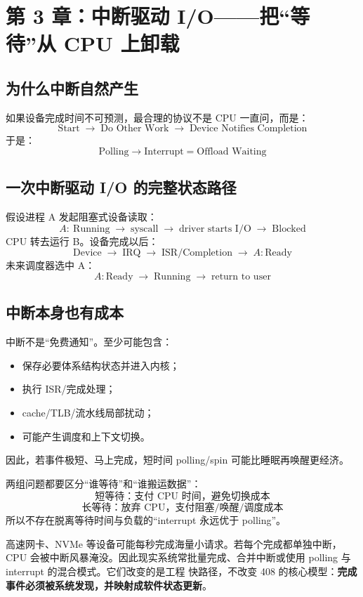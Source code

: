 \documentclass[UTF8,fontset=fandol,11pt,a4paper]{ctexart}
\newcommand{\kw}[1]{\textbf{#1}}
\newcommand{\arr}{\;\longrightarrow\;}
\begin{document}
\section{第 3 章：中断驱动 I/O——把“等待”从 CPU 上卸载}

\subsection{为什么中断自然产生}
如果设备完成时间不可预测，最合理的协议不是 CPU 一直问，而是：
\[
\boxed{\text{Start}\arr\text{Do Other Work}\arr\text{Device Notifies Completion}}
\]
于是：
\[
\boxed{\text{Polling}\to\text{Interrupt}=\text{Offload Waiting}}
\]

\subsection{一次中断驱动 I/O 的完整状态路径}
假设进程 A 发起阻塞式设备读取：
\[
A:\ \text{Running}
\arr \text{syscall}
\arr \text{driver starts I/O}
\arr \text{Blocked}
\]
CPU 转去运行 B。设备完成以后：
\[
\text{Device}\arr\text{IRQ}\arr\text{ISR/Completion}\arr A:\text{Ready}
\]
未来调度器选中 A：
\[
A:\text{Ready}\arr\text{Running}\arr\text{return to user}
\]

\subsection{中断本身也有成本}
中断不是“免费通知”。至少可能包含：
\begin{itemize}
  \item 保存必要体系结构状态并进入内核；
  \item 执行 ISR/完成处理；
  \item cache/TLB/流水线局部扰动；
  \item 可能产生调度和上下文切换。
\end{itemize}
因此，若事件极短、马上完成，短时间 polling/spin 可能比睡眠再唤醒更经济。

\begin{bridge}[与并发专题同构：Polling vs Interrupt = Spin vs Sleep]
两组问题都要区分“谁等待”和“谁搬运数据”：
\[
\boxed{\text{短等待：支付 CPU 时间，避免切换成本}}
\]
\[
\boxed{\text{长等待：放弃 CPU，支付阻塞/唤醒/调度成本}}
\]
所以不存在脱离等待时间与负载的“interrupt 永远优于 polling”。
\end{bridge}

\begin{eng}
高速网卡、NVMe 等设备可能每秒完成海量小请求。若每个完成都单独中断，CPU 会被中断风暴淹没。因此现实系统常批量完成、合并中断或使用 polling 与 interrupt 的混合模式。它们改变的是工程 快路径，不改变 408 的核心模型：\kw{完成事件必须被系统发现，并映射成软件状态更新}。
\end{eng}
\end{document}
